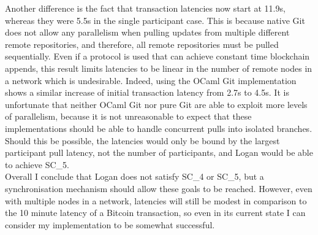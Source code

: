 \documentclass[12pt,a4paper,twoside,openright]{report}
\begin{document}
	Another difference is the fact that transaction latencies now start at 11.9s, whereas they were 5.5s in the single participant case.
	This is because native Git does not allow any parallelism when pulling updates from multiple different remote repositories, and therefore, all remote repositories must be pulled sequentially.
	Even if a protocol is used that can achieve constant time blockchain appends, this result limits latencies to be linear in the number of remote nodes in a network which is undesirable. 
	Indeed, using the OCaml Git implementation shows a similar increase of initial transaction latency from 2.7s to 4.5s.
	It is unfortunate that neither OCaml Git nor pure Git are able to exploit more levels of parallelism, because it is not unreasonable to expect that these implementations should be able to handle concurrent pulls into isolated branches. 
	Should this be possible, the latencies would only be bound by the largest participant pull latency, not the number of participants, and Logan would be able to achieve SC\_5. \\

	Overall I conclude that Logan does not satisfy SC\_4 or SC\_5, but a synchronisation mechanism should allow these goals to be reached. 
	However, even with multiple nodes in a network, latencies will still be modest in comparison to the 10 minute latency of a Bitcoin transaction, so even in its current state I can consider my implementation to be somewhat successful.
\end{document}

